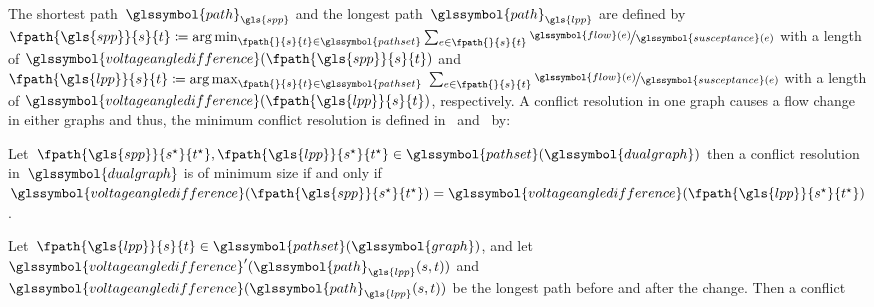 \begin{definition}
    The shortest path~$\glssymbol{path}_{\gls{spp}}$ and the longest
    path~$\glssymbol{path}_{\gls{lpp}}$ are defined by~$
        \fpath{\gls{spp}}{\source}{\sink}
        \coloneqq
        \argmin_{ \fpath{}{\source}{\sink} \in \glssymbol{pathset} } 
        \sum_{\edge\in\fpath{}{\source}{\sink}}
        \nicefrac{
            \glssymbol{flow}(\edge)
        }{
            \glssymbol{susceptance}(\edge)
        }
    $ with a length of $
        \glssymbol{voltageangledifference}(\fpath{\gls{spp}}{\source}{\sink})
    $ and~$
        \fpath{\gls{lpp}}{\source}{\sink}
        \coloneqq \argmax_{\fpath{}{\source}{\sink} \in \glssymbol{pathset} } 
    $ 
    $
        \sum_{\edge\in\fpath{}{\source}{\sink}}
        \nicefrac{\glssymbol{flow}(\edge)}{\glssymbol{susceptance}(\edge)}
    $ with a length of $
        \glssymbol{voltageangledifference}(\fpath{\gls{lpp}}{\source}{\sink})
    $, respectively. A conflict resolution in one graph causes a flow change in
    either graphs and thus, the minimum conflict resolution is defined
    in~ and~ by:
    \begin{compactenum}[\hspace*{1cm}(CR--1)]
    \item
    Let~$\fpath{\gls{spp}}{\source^\star}{\sink^\star},\fpath{\gls{lpp}}{\source^\star}
    {\sink^\star}\in\glssymbol{pathset}(\glssymbol{dualgraph})$ then a conflict
    resolution in~$\glssymbol{dualgraph}$ is of minimum size if and only
    if~$    
        \glssymbol{voltageangledifference}(
            \fpath{\gls{spp}}{\source^\star}{\sink^\star}
        ) 
        = 
        \glssymbol{voltageangledifference}(
            \fpath{\gls{lpp}}{\source^\star}{\sink^\star}
        )
    $.
    \label{ch:network-analyzes:CR:1}
    \item
    Let~$
        \fpath{\gls{lpp}}{\source}{\sink}
        \in
        \glssymbol{pathset}(\glssymbol{graph})
    $, and
    let~$
        \glssymbol{voltageangledifference}'(
            \glssymbol{path}_{\gls{lpp}}(\source,\sink)
        )
    $ and~$
        \glssymbol{voltageangledifference}(
            \glssymbol{path}_{\gls{lpp}}(\source,\sink))
    $ be the longest path before and after the change. Then a conflict

\end{compactenum}
\end{definition}
